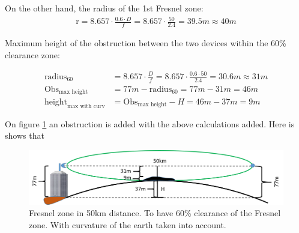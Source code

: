 On the other hand, the radius of the 1st Fresnel zone:
\begin{align*}
\text{r} = 8.657\cdot \frac{0.6\cdot D}{f} = 8.657\cdot \frac{50}{2.4} = 39.5m \approx 40m 
\end{align*}

\noindent Maximum height of the obstruction between the two devices within the 60\% clearance zone:

\begin{align*}
\text{radius}_{60} &= 8.657\cdot \frac{D}{f} = 8.657\cdot \frac{0.6\cdot 50}{2.4} = 30.6m \approx 31m \\
\text{Obs}_{\text{max height}} &= 77m - \text{radius}_{60} = 77m - 31m = 46m \\
\text{height}_{\text{max with curv}} &= \text{Obs}_{\text{max height}} - H = 46m - 37m = 9m
\end{align*}

\noindent On figure \ref{fig:fresnel_50km_curvature_obstacle} an obstruction is added with the above calculations added. Here is shows that 

\begin{figure}[H]
	\centering
	\includegraphics[scale=0.50]{figures/fresnel_50km_curvature_obstacle.png}
	\caption{Fresnel zone in 50km distance. To have 60\% clearance of the Fresnel zone. With curvature of the earth taken into account.}
	\label{fig:fresnel_50km_curvature_obstacle}
\end{figure}  

